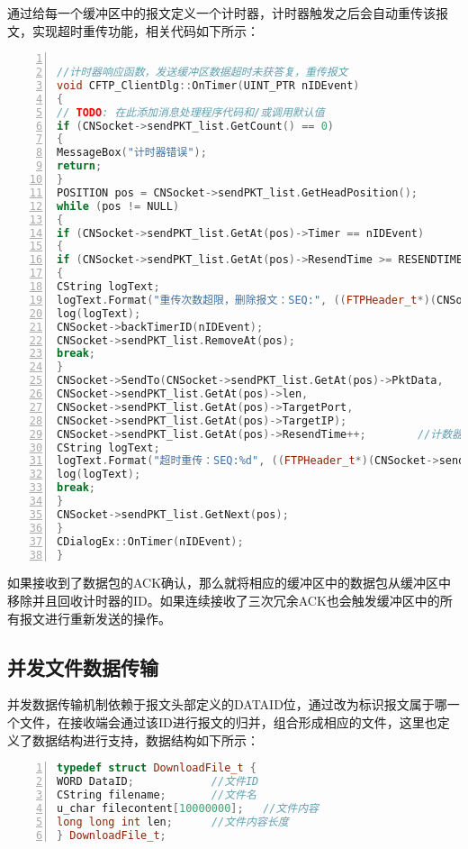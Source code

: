 \documentclass[lang=cn,11pt]{elegantpaper}
\begin{document}
通过给每一个缓冲区中的报文定义一个计时器，计时器触发之后会自动重传该报文，实现超时重传功能，相关代码如下所示：

\begin{lstlisting}[language = C++, numbers=left, 
numberstyle=\tiny,keywordstyle=\color{blue!70},
commentstyle=\color{red!50!green!50!blue!50},frame=shadowbox,
rulesepcolor=\color{red!20!green!20!blue!20},basicstyle=\ttfamily]

//计时器响应函数，发送缓冲区数据超时未获答复，重传报文
void CFTP_ClientDlg::OnTimer(UINT_PTR nIDEvent)
{
// TODO: 在此添加消息处理程序代码和/或调用默认值
if (CNSocket->sendPKT_list.GetCount() == 0)
{
MessageBox("计时器错误");
return;
}
POSITION pos = CNSocket->sendPKT_list.GetHeadPosition();
while (pos != NULL)
{
if (CNSocket->sendPKT_list.GetAt(pos)->Timer == nIDEvent)
{
if (CNSocket->sendPKT_list.GetAt(pos)->ResendTime >= RESENDTIMELIMIT)		//重传次数超过上限，报错，删除重传报文
{
CString logText;
logText.Format("重传次数超限，删除报文：SEQ:", ((FTPHeader_t*)(CNSocket->sendPKT_list.GetAt(pos)->PktData))->SEQNO);
log(logText);
CNSocket->backTimerID(nIDEvent);
CNSocket->sendPKT_list.RemoveAt(pos);
break;
}
CNSocket->SendTo(CNSocket->sendPKT_list.GetAt(pos)->PktData,
CNSocket->sendPKT_list.GetAt(pos)->len,
CNSocket->sendPKT_list.GetAt(pos)->TargetPort,
CNSocket->sendPKT_list.GetAt(pos)->TargetIP);
CNSocket->sendPKT_list.GetAt(pos)->ResendTime++;		//计数器增加1
CString logText;
logText.Format("超时重传：SEQ:%d", ((FTPHeader_t*)(CNSocket->sendPKT_list.GetAt(pos)->PktData))->SEQNO);
log(logText);
break;
}
CNSocket->sendPKT_list.GetNext(pos);
}
CDialogEx::OnTimer(nIDEvent);
}
\end{lstlisting}

如果接收到了数据包的ACK确认，那么就将相应的缓冲区中的数据包从缓冲区中移除并且回收计时器的ID。如果连续接收了三次冗余ACK也会触发缓冲区中的所有报文进行重新发送的操作。

\subsection{并发文件数据传输}

并发数据传输机制依赖于报文头部定义的DATAID位，通过改为标识报文属于哪一个文件，在接收端会通过该ID进行报文的归并，组合形成相应的文件，这里也定义了数据结构进行支持，数据结构如下所示：

\begin{lstlisting}[language = C++, numbers=left, 
numberstyle=\tiny,keywordstyle=\color{blue!70},
commentstyle=\color{red!50!green!50!blue!50},frame=shadowbox,
rulesepcolor=\color{red!20!green!20!blue!20},basicstyle=\ttfamily]
typedef struct DownloadFile_t {
WORD DataID;			//文件ID
CString filename;		//文件名
u_char filecontent[10000000];	//文件内容
long long int len;		//文件内容长度
} DownloadFile_t;
\end{lstlisting}
\end{document}
